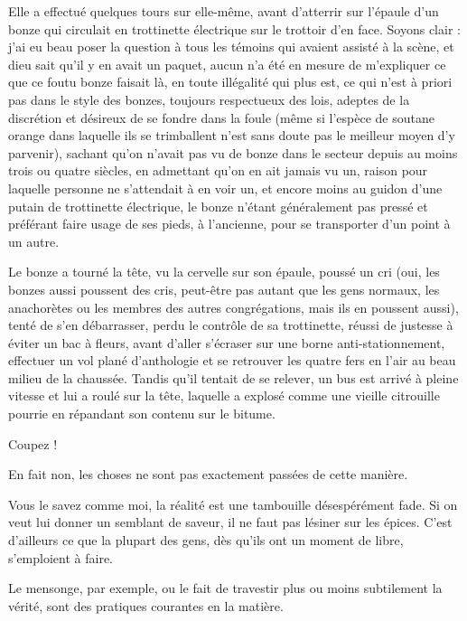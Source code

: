 Elle a effectué quelques tours sur elle-même, avant d’atterrir sur l’épaule d’un bonze qui circulait en trottinette électrique sur le trottoir d’en face. Soyons clair : j’ai eu beau poser la question à tous les témoins qui avaient assisté à la scène, et dieu sait qu’il y en avait un paquet, aucun n’a été en mesure de m’expliquer ce que ce foutu bonze faisait là, en toute illégalité qui plus est, ce qui n’est à priori pas dans le style des bonzes, toujours respectueux des lois, adeptes de la discrétion et désireux de se fondre dans la foule (même si l’espèce de soutane orange dans laquelle ils se trimballent n’est sans doute pas le meilleur moyen d’y parvenir), sachant qu’on n’avait pas vu de bonze dans le secteur depuis au moins trois ou quatre siècles, en admettant qu’on en ait jamais vu un, raison pour laquelle personne ne s’attendait à en voir un, et encore moins au guidon d’une putain de trottinette électrique, le bonze n’étant généralement pas pressé et préférant faire usage de ses pieds, à l’ancienne, pour se transporter d’un point à un autre.

Le bonze a tourné la tête, vu la cervelle sur son épaule, poussé un cri (oui, les bonzes aussi poussent des cris, peut-être pas autant que les gens normaux, les anachorètes ou les membres des autres congrégations, mais ils en poussent aussi), tenté de s’en débarrasser, perdu le contrôle de sa trottinette, réussi de justesse à éviter un bac à fleurs, avant d’aller s’écraser sur une borne anti-stationnement, effectuer un vol plané d’anthologie et se retrouver les quatre fers en l’air au beau milieu de la chaussée. Tandis qu’il tentait de se relever, un bus est arrivé à pleine vitesse et lui a roulé sur la tête, laquelle a explosé comme une vieille citrouille pourrie en répandant son contenu sur le bitume.

Coupez !

En fait non, les choses ne sont pas exactement passées de cette manière.

\label{rat:52}%
Vous le savez comme moi, la réalité est une tambouille désespérément fade. Si on veut lui donner un semblant de saveur, il ne faut pas lésiner sur les épices. C’est d’ailleurs ce que la plupart des gens, dès qu’ils ont un moment de libre, s’emploient à faire.

Le mensonge, par exemple, ou le fait de travestir plus ou moins subtilement la vérité, sont des pratiques courantes en la matière.

